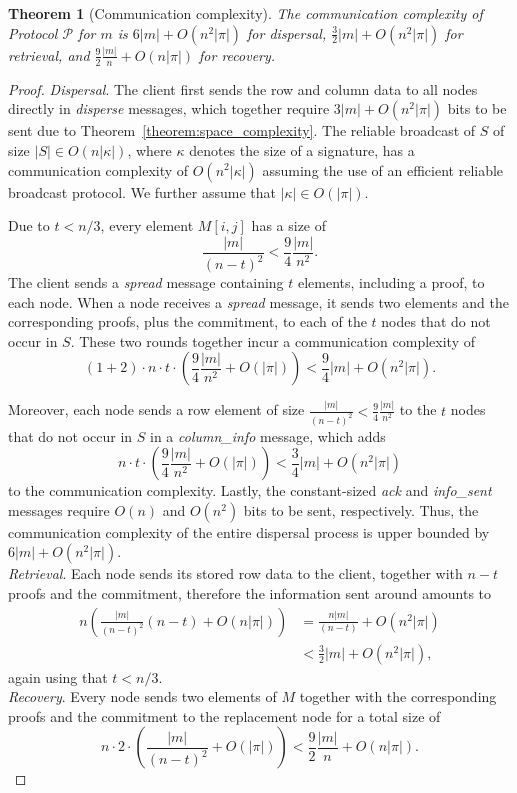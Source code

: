 \documentclass[10pt,a4paper]{amsart}
\newtheorem{theorem}{Theorem}
\begin{document}
\begin{theorem}[Communication complexity]
The communication complexity of Protocol $\mathcal{P}$ for $m$ is
 $6|m| + O(n^2|\pi|)$ for dispersal,
 $\frac{3}{2}|m| + O(n^2|\pi|)$ for retrieval, and
 $\frac{9}{2}\frac{|m|}{n} + O(n|\pi|)$ for recovery.
\end{theorem}

\begin{proof}
\emph{Dispersal}. The client first sends the row and column data to all nodes directly in \emph{disperse} messages, which together require $3|m|+O(n^2|\pi|)$ bits to be sent due to Theorem~\ref{theorem:space_complexity}. The reliable broadcast of $S$ of size $|S| \in O(n|\kappa|)$, where $\kappa$ denotes the size of a signature, has a communication complexity of $O(n^2|\kappa|)$ assuming the use of an efficient reliable broadcast protocol. We further assume that $|\kappa| \in O(|\pi|)$.

Due to $t < n/3$, every element $M[i,j]$ has a size of $$\frac{|m|}{(n-t)^2} < \frac{9}{4}\frac{|m|}{n^2}.$$
The client sends a \emph{spread} message containing $t$ elements, including a proof, to each node. When a node receives a 
\emph{spread} message, it sends two elements and the corresponding proofs, plus the commitment, to each of the $t$ nodes that do not occur in $S$. These two rounds together incur a communication complexity of
$$(1 + 2)\cdot n \cdot t \cdot \left(\frac{9}{4}\frac{|m|}{n^2} + O(|\pi|)\right) < \frac{9}{4}|m| + O(n^2|\pi|).$$

Moreover, each node sends a row element of size $\frac{|m|}{(n-t)^2} < \frac{9}{4}\frac{|m|}{n^2}$ to the $t$ nodes that do not occur in $S$ in a \emph{column\_info} message, which adds
$$n \cdot t \cdot \left(\frac{9}{4}\frac{|m|}{n^2} + O(|\pi|)\right) < \frac{3}{4} |m| + O(n^2|\pi|)$$
to the communication complexity.
Lastly, the constant-sized \emph{ack} and \emph{info\_sent} messages require $O(n)$ and $O(n^2)$ bits to be sent, respectively. Thus, the communication complexity of the entire dispersal process is upper bounded by $6|m| + O(n^2|\pi|)$.
\\
\emph{Retrieval}. Each node sends its stored row data to the client, together with $n-t$ proofs and the commitment, therefore the information sent around amounts to 
\begin{align*}
n\left(\frac{|m|}{(n-t)^2}(n-t) + O(n|\pi|)\right) &= \frac{n|m|}{(n-t)} + O(n^2|\pi|) \\
&< \frac{3}{2}|m| + O(n^2|\pi|),
\end{align*}
again using that $t < n/3$.
\\
\emph{Recovery}. Every node sends two elements of $M$ together with the corresponding proofs and the commitment to the replacement node for a total size of
$$n \cdot 2 \cdot \left(\frac{|m|}{(n-t)^2} + O(|\pi|)\right) < \frac{9}{2}\frac{|m|}{n} + O(n|\pi|).$$
\end{proof}
\end{document}
